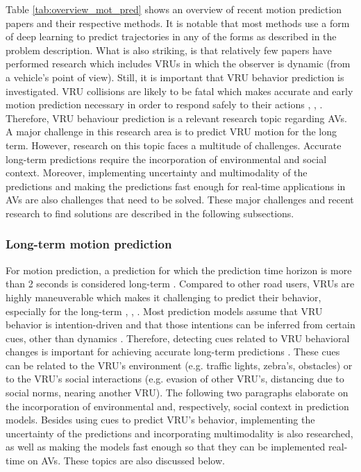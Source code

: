 Table \ref{tab:overview_mot_pred} shows an overview of recent motion prediction papers and their respective methods. It is notable that most methods use a form of deep learning to predict trajectories in any of the forms as described in the problem description. What is also striking, is that relatively few papers have performed research which includes \glspl{VRU} in which the observer is dynamic (from a vehicle's point of view). Still, it is important that \gls{VRU} behavior prediction is investigated. \gls{VRU} collisions are likely to be fatal which makes accurate and early motion prediction necessary in order to respond safely to their actions \cite{rehder2018pedestrian}, \cite{chou2020predicting}, \cite{uah2020d4}. Therefore, \gls{VRU} behaviour prediction is a relevant research topic regarding \glspl{AV}.\\
A major challenge in this research area is to predict \gls{VRU} motion for the long term. However, research on this topic faces a multitude of challenges. Accurate long-term predictions require the incorporation of environmental and social context. Moreover, implementing uncertainty and multimodality of the predictions and making the predictions fast enough for real-time applications in \glspl{AV} are also challenges that need to be solved. These major challenges and recent research to find solutions are described in the following subsections. 

\subsubsection{Long-term motion prediction}
For motion prediction, a prediction for which the prediction time horizon is more than 2 seconds is considered long-term \cite{hormann2020long}. Compared to other road users, \glspl{VRU} are highly maneuverable which makes it challenging to predict their behavior, especially for the long-term \cite{xiong2019recurrent}, \cite{rehder2018pedestrian}, \cite{rehder2018pedestrian}. Most prediction models assume that \gls{VRU} behavior is intention-driven and that those intentions can be inferred from certain cues, other than dynamics \cite{rehder2018pedestrian}. Therefore, detecting cues related to \gls{VRU} behavioral changes is important for achieving accurate long-term predictions \cite{pool2017using}. These cues can be related to the \gls{VRU}'s environment (e.g. traffic lights, zebra's, obstacles) or to the \gls{VRU}'s social interactions (e.g. evasion of other \gls{VRU}'s, distancing due to social norms, nearing another \gls{VRU}). The following two paragraphs elaborate on the incorporation of environmental and, respectively, social context in prediction models. Besides using cues to predict \gls{VRU}'s behavior, implementing the uncertainty of the predictions and incorporating multimodality is also researched, as well as making the models fast enough so that they can be implemented real-time on \glspl{AV}. These topics are also discussed below. 

